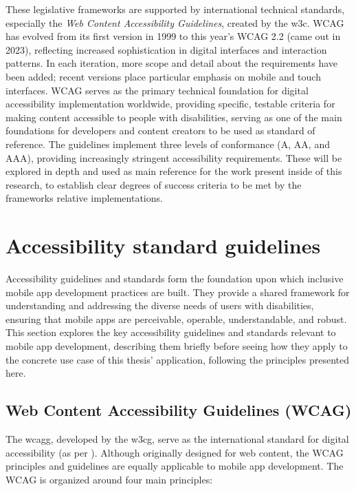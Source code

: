 These legislative frameworks are supported by international technical standards, especially the \textit{Web Content Accessibility Guidelines}, created by the \acrshort{w3c}. WCAG has evolved from its first version in 1999 to this year's WCAG 2.2 (came out in 2023), reflecting increased sophistication in digital interfaces and interaction patterns. In each iteration, more scope and detail about the requirements have been added; recent versions place particular emphasis on mobile and touch interfaces. WCAG serves as the primary technical foundation for digital accessibility implementation worldwide, providing specific, testable criteria for making content accessible to people with disabilities, serving as one of the main foundations for developers and content creators to be used as standard of reference. The guidelines implement three levels of conformance (A, AA, and AAA), providing increasingly stringent accessibility requirements. These will be explored in depth and used as main reference for the work present inside of this research, to establish clear degrees of success criteria to be met by the frameworks relative implementations.

\section{Accessibility standard guidelines}
\label{sec:guidelines}

Accessibility guidelines and standards form the foundation upon which inclusive mobile app development practices are built. They provide a shared framework for understanding and addressing the diverse needs of users with disabilities, ensuring that mobile apps are perceivable, operable, understandable, and robust. This section explores the key accessibility guidelines and standards relevant to mobile app development, describing them briefly before seeing how they apply to the concrete use case of this thesis' application, following the principles presented here.

\subsection{Web Content Accessibility Guidelines (WCAG)}

The \gls{wcagg}, developed by the \gls{w3cg}, serve as the international standard for digital accessibility (as per \cite{site:wcag}). Although originally designed for web content, the WCAG principles and guidelines are equally applicable to mobile app development. The WCAG is organized around four main principles:

